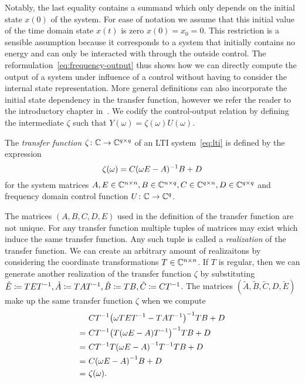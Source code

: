 Notably, the last equality contains a summand which only depends on the initial state $x(0)$ of the system.
For ease of notation we assume that this initial value of the time domain state $x(t)$ is zero $x(0) = x_0 = 0$.
This restriction is a sensible assumption because it corresponds to a system that initially contains no energy and can only be interacted with through the outside control.
The reformulation~\eqref{eq:frequency-output} thus shows how we can directly compute the output of a system under influence of a control without having to consider the internal state representation.
More general definitions can also incorporate the initial state dependency in the transfer function, however we refer the reader to the introductory chapter in~\cite{Benner2017}.
We codify the control-output relation by defining the intermediate $\zeta$ such that $Y(\omega) = \zeta(\omega) U(\omega)$.

\begin{definition}\label{def:transfer-function}
    The \emph{transfer function} $\zeta \colon \mathbb{C} \to \mathbb{C}^{q \times q}$ of an \ac{LTI} system~\eqref{eq:lti} is defined by the expression
    \begin{equation}\label{eq:transfer-function}
        \zeta(\omega) = C (\omega E - A)^{-1} B + D
    \end{equation}
    for the system matrices $A, E \in \mathbb{C}^{n \times n}, B \in \mathbb{C}^{n \times q}, C \in \mathbb{C}^{q \times n}, D \in \mathbb{C}^{q \times q}$ and frequency domain control function $U \colon \mathbb{C} \to \mathbb{C}^{q}$.
\end{definition}

\begin{remark}
    The matrices $(A, B, C, D, E)$ used in the definition of the transfer function are not unique.
    For any transfer function multiple tuples of matrices may exist which induce the same transfer function.
    Any such tuple is called a \emph{realization} of the transfer function.
    We can create an arbitrary amount of realizaitons by considering the coordinate transformations $T \in \mathbb{C}^{n \times n}$.
    If $T$ is regular, then we can generate another realization of the transfer function $\zeta$ by substituting $\tilde{E} \coloneqq T E T^{-1}, \tilde{A} \coloneqq T A T^{-1}, \tilde{B} \coloneqq T B, \tilde{C} \coloneqq C T^{-1}$.
    The matrices $(\tilde{A}, \tilde{B}, \tilde{C}, D, \tilde{E})$ make up the same transfer function $\zeta$ when we compute
    \begin{align*}
        &C T^{-1} {\left( \omega T E T^{-1} - T A T^{-1} \right)}^{-1} T B + D \\
        =\ &C T^{-1} {\left( T (\omega E - A) T^{-1} \right)}^{-1} T B + D \\
        =\ &C T^{-1} T {\left( \omega E - A \right)}^{-1} T^{-1} T B + D \\
        =\ &C {(\omega E - A)}^{-1} B + D \\
        =\ &\zeta(\omega).
    \end{align*}
\end{remark}

